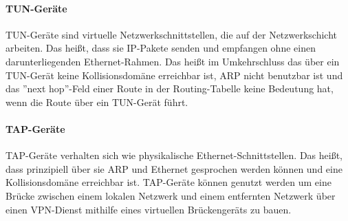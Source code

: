 \paragraph{TUN-Geräte}
TUN-Geräte sind virtuelle Netzwerkschnittstellen, die auf der Netzwerkschicht arbeiten.
Das heißt, dass sie IP-Pakete senden und empfangen ohne einen darunterliegenden Ethernet-Rahmen.
Das heißt im Umkehrschluss das über ein TUN-Gerät keine Kollisionsdomäne erreichbar ist,
ARP nicht benutzbar ist und das ''next hop''-Feld einer Route in der Routing-Tabelle
keine Bedeutung hat, wenn die Route über ein TUN-Gerät führt.

\paragraph{TAP-Geräte}
TAP-Geräte verhalten sich wie physikalische Ethernet-Schnittstellen.
Das heißt, dass prinzipiell über sie ARP und Ethernet gesprochen werden können
und eine Kollisionsdomäne erreichbar ist. TAP-Geräte können genutzt werden
um eine Brücke zwischen einem lokalen Netzwerk und einem entfernten
Netzwerk über einen \ac{VPN}-Dienst mithilfe eines virtuellen Brückengeräts
zu bauen.
